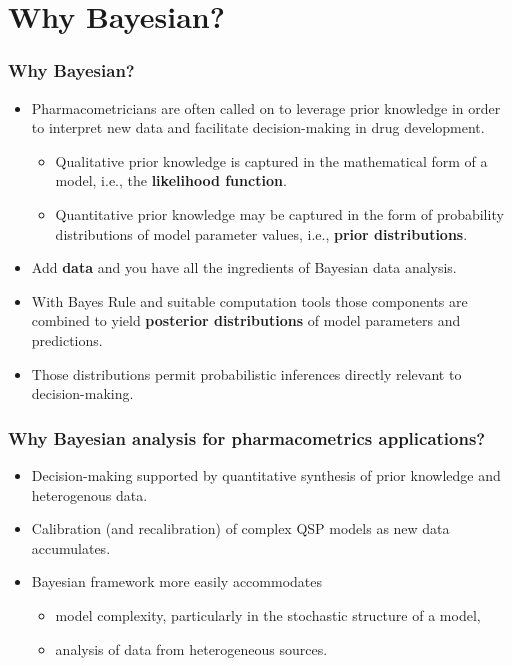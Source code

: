 \documentclass[handout]{beamer}
\begin{document}
\section{Why Bayesian?}

\begin{frame}
  \frametitle{Why Bayesian?}

  \begin{itemize}
  \item<1-> Pharmacometricians are often called on to leverage prior knowledge
  in order to interpret new data and facilitate decision-making in
  drug development.
  \begin{itemize}
  \item<2-> Qualitative prior knowledge is captured in the mathematical
    form of a model, i.e., the \textcolor{mrggreen}{\bf likelihood function}.
  \item<3-> Quantitative prior knowledge may be captured in the form of
    probability distributions of model parameter values, i.e.,
    \textcolor{mrggreen}{\bf prior
    distributions}.
  \end{itemize}
  \item<4-> Add \textcolor{mrggreen}{\bf data} and you have all the ingredients of Bayesian data
    analysis.
\item<5-> With Bayes Rule and suitable computation tools those components
  are combined to yield \textcolor{mrggreen}{\bf posterior distributions} of model parameters
  and predictions.
\item<5-> Those distributions permit probabilistic inferences directly
  relevant to decision-making.
  \end{itemize}

\end{frame}

\begin{frame}
  \frametitle{Why Bayesian analysis for pharmacometrics applications?}
  
  \begin{itemize}
  \item Decision-making supported by quantitative synthesis of prior
    knowledge and heterogenous data.
  \item Calibration (and recalibration) of complex QSP models as new
    data accumulates.
  \item Bayesian framework more easily accommodates
    \begin{itemize}
    \item model complexity, particularly in the stochastic structure
      of a model,
    \item analysis of data from heterogeneous sources.
    \end{itemize}
  \end{itemize}

\end{frame}
\end{document}
